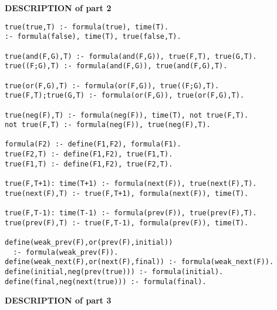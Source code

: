 \textbf{DESCRIPTION of part 2}

\begin{center}
\begin{minipage}{\linewidth}
  \begin{lstlisting}[]
true(true,T) :- formula(true), time(T).
:- formula(false), time(T), true(false,T).

true(and(F,G),T) :- formula(and(F,G)), true(F,T), true(G,T).
true((F;G),T) :- formula(and(F,G)), true(and(F,G),T).

true(or(F,G),T) :- formula(or(F,G)), true((F;G),T).
true(F,T);true(G,T) :- formula(or(F,G)), true(or(F,G),T).

true(neg(F),T) :- formula(neg(F)), time(T), not true(F,T).
not true(F,T) :- formula(neg(F)), true(neg(F),T).

formula(F2) :- define(F1,F2), formula(F1).
true(F2,T) :- define(F1,F2), true(F1,T).
true(F1,T) :- define(F1,F2), true(F2,T).

true(F,T+1): time(T+1) :- formula(next(F)), true(next(F),T).
true(next(F),T) :- true(F,T+1), formula(next(F)), time(T).

true(F,T-1): time(T-1) :- formula(prev(F)), true(prev(F),T).
true(prev(F),T) :- true(F,T-1), formula(prev(F)), time(T).

define(weak_prev(F),or(prev(F),initial))
  :- formula(weak_prev(F)).
define(weak_next(F),or(next(F),final)) :- formula(weak_next(F)).
define(initial,neg(prev(true))) :- formula(initial).
define(final,neg(next(true))) :- formula(final).
\end{lstlisting}
\end{minipage}
\end{center}

\textbf{DESCRIPTION of part 3}

